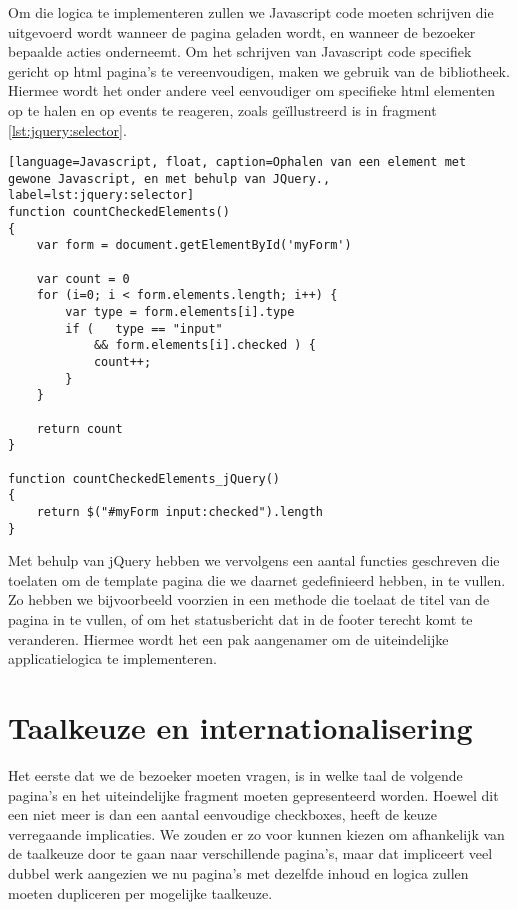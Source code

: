 Om die logica te implementeren zullen we Javascript code moeten schrijven die uitgevoerd wordt wanneer de pagina geladen wordt, en wanneer de bezoeker bepaalde acties onderneemt. Om het schrijven van Javascript code specifiek gericht op \ac{html} pagina's te vereenvoudigen, maken we gebruik van de  bibliotheek. Hiermee wordt het onder andere veel eenvoudiger om specifieke \ac{html} elementen op te halen en op events te reageren, zoals geïllustreerd is in fragment \ref{lst:jquery:selector}.
\begin{lstlisting}[language=Javascript, float, caption=Ophalen van een element met gewone Javascript, en met behulp van JQuery., label=lst:jquery:selector]
function countCheckedElements()
{
	var form = document.getElementById('myForm')
	
	var count = 0
	for (i=0; i < form.elements.length; i++) {
		var type = form.elements[i].type
		if (   type == "input"
		    && form.elements[i].checked ) {
			count++;
		}
	}
	
	return count
}

function countCheckedElements_jQuery()
{
	return $("#myForm input:checked").length
}
\end{lstlisting}

Met behulp van jQuery hebben we vervolgens een aantal functies geschreven die toelaten om de template pagina die we daarnet gedefinieerd hebben, in te vullen. Zo hebben we bijvoorbeeld voorzien in een  methode die toelaat de titel van de pagina in te vullen, of  om het statusbericht dat in de footer terecht komt te veranderen. Hiermee wordt het een pak aangenamer om de uiteindelijke applicatielogica te implementeren.

\section{Taalkeuze en internationalisering}

Het eerste dat we de bezoeker moeten vragen, is in welke taal de volgende pagina's en het uiteindelijke fragment moeten gepresenteerd worden. Hoewel dit een niet meer is dan een aantal eenvoudige checkboxes, heeft de keuze verregaande implicaties. We zouden er zo voor kunnen kiezen om afhankelijk van de taalkeuze door te gaan naar verschillende pagina's, maar dat impliceert veel dubbel werk aangezien we nu pagina's met dezelfde inhoud en logica zullen moeten dupliceren per mogelijke taalkeuze.

